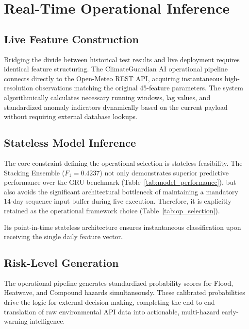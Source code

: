 \section{Real-Time Operational Inference}
\label{sec:realtime}
\subsection{Live Feature Construction}
Bridging the divide between historical test results and live deployment requires identical feature structuring. The ClimateGuardian AI operational pipeline connects directly to the Open-Meteo REST API, acquiring instantaneous high-resolution observations matching the original 45-feature parameters. The system algorithmically calculates necessary running windows, lag values, and standardized anomaly indicators dynamically based on the current payload without requiring external database lookups. 

\subsection{Stateless Model Inference}
The core constraint defining the operational selection is stateless feasibility. The Stacking Ensemble ($F_1 = 0.4237$) not only demonstrates superior predictive performance over the GRU benchmark (Table~\ref{tab:model_performance}), but also avoids the significant architectural bottleneck of maintaining a mandatory 14-day sequence input buffer during live execution. Therefore, it is explicitly retained as the operational framework choice (Table~\ref{tab:op_selection}).

\begin{table}[htbp]
\caption{Operational Model Selection}
\begin{center}
\label{tab:op_selection}
\end{center}
\end{table}
 Its point-in-time stateless architecture ensures instantaneous classification upon receiving the single daily feature vector.

\subsection{Risk-Level Generation}
The operational pipeline generates standardized probability scores for Flood, Heatwave, and Compound hazards simultaneously. These calibrated probabilities drive the logic for external decision-making, completing the end-to-end translation of raw environmental API data into actionable, multi-hazard early-warning intelligence.
